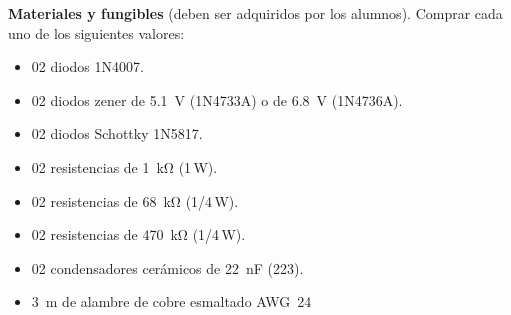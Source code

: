 \documentclass[11pt,a4paper]{article}
\begin{document}
\vspace{0.25cm}
\noindent\textbf{Materiales y fungibles} (deben ser adquiridos por los alumnos). Comprar cada uno
de los siguientes valores:
\begin{itemize}
    \item 02 diodos 1N4007.
    \item 02 diodos zener de \qty{5.1}{\volt} (1N4733A) o de \qty{6.8}{\volt} (1N4736A).
    \item 02 diodos Schottky 1N5817.
    \item 02 resistencias de \qty{1}{\kilo\ohm} (1\,\unit{\watt}).
    \item 02 resistencias de \qty{68}{\kilo\ohm} (1/4\,\unit{\watt}).
    \item 02 resistencias de \qty{470}{\kilo\ohm} (1/4\,\unit{\watt}).
    \item 02 condensadores cerámicos de \qty{22}{\nano\farad} (223).
    \item \qty{3}{\metre} de alambre de cobre esmaltado AWG~24

\end{itemize}
\end{document}
